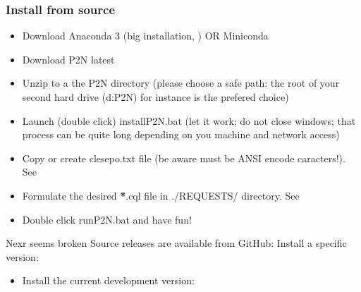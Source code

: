\documentclass[letterpaper,10pt,english]{sphinxmanual}
\begin{document}
\subsubsection{Install from source}
\label{\detokenize{setup:install-from-source}}\begin{itemize}
\item {} 
Download Anaconda 3 (big installation, ) OR Miniconda 

\item {} 
Download P2N latest 

\item {} 
Unzip to a the P2N directory (please choose a safe path: the root of your second hard drive (d:P2N) for instance is the prefered choice)

\item {} 
Launch (double click) installP2N.bat (let it work; do not close windows; that process can be quite long depending on you machine and network access)

\item {} 
Copy or create cles\sphinxhyphen{}epo.txt file (be aware must be ANSI encode caracters!). See 

\item {} 
Formulate the desired {\color{red}\bfseries{}*}.cql file in ./REQUESTS/ directory. See 

\item {} 
Double click runP2N.bat and have fun!

\end{itemize}

Nexr seems broken
\sphinxhyphen{} Source releases are available from GitHub: 
\sphinxhyphen{} Install a specific version:

\begin{sphinxVerbatim}[commandchars=\\\{\}]
   
\end{sphinxVerbatim}
\begin{itemize}
\item {} 
Install the current development version:

\begin{sphinxVerbatim}[commandchars=\\\{\}]
   
\end{sphinxVerbatim}

\end{itemize}
\end{document}
